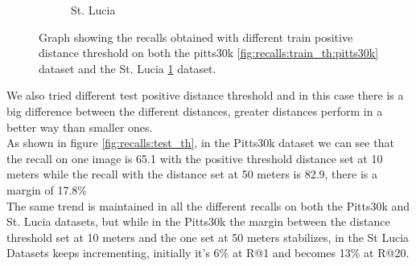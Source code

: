 \documentclass[10pt,twocolumn,letterpaper]{article}
\begin{document}
\begin{figure}
\begin{subfigure}[b]{0.23\textwidth}
		\caption{St. Lucia}
		\label{fig:recalls:train_th:st_lucia}
	\end{subfigure}
	\caption{Graph showing the recalls obtained with different train positive distance threshold on both the pitts30k \ref{fig:recalls:train_th:pitts30k} dataset and the St. Lucia \ref{fig:recalls:train_th:st_lucia} dataset.}
	\label{fig:recalls:train_th}
\end{figure}
We also tried different test positive distance threshold and in this case there is a big difference between the different distances, greater distances perform in a better way than smaller ones.\\
As shown in figure \ref{fig:recalls:test_th}, in the Pitts30k dataset we can see that the recall on one image is 65.1 with the positive threshold distance set at 10 meters while the recall with the distance set at 50 meters is 82.9, there is a margin of 17.8\%\\
The same trend is maintained in all the different recalls on both the Pitts30k and St. Lucia datasets, but while in the Pitts30k the margin between the distance threshold set at 10 meters and the one set at 50 meters stabilizes, in the St Lucia Datasets keeps incrementing, initially it's 6\% at R@1 and becomes 13\% at R@20.
\end{document}
